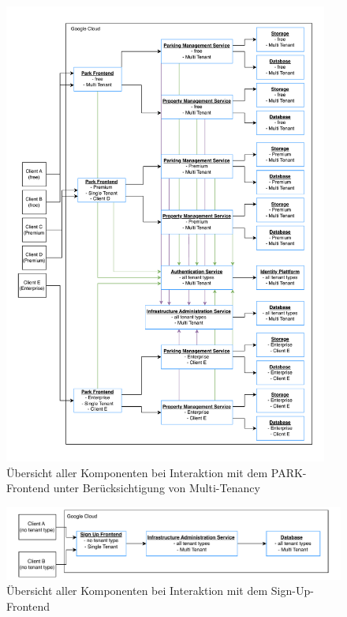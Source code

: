 \begin{figure}[H]
	\centering
	\includegraphics[width=0.95\textwidth]{resources/03-runtime-view/pdf/components-frontend-park.pdf}
	\caption{Übersicht aller Komponenten bei Interaktion mit dem PARK-Frontend unter Berücksichtigung von Multi-Tenancy}
	\label{fig:components-park-frontend}
\end{figure}

\begin{figure}[H]
	\centering
	\includegraphics[width=\textwidth]{resources/03-runtime-view/pdf/components-frontend-signup.pdf}
	\caption{Übersicht aller Komponenten bei Interaktion mit dem Sign-Up-Frontend}
	\label{fig:components-signup-frontend}
\end{figure}

